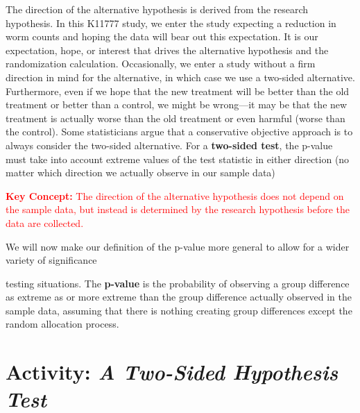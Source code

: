 \documentclass[
]{report}
\begin{document}
The direction of the alternative hypothesis is derived from the research hypothesis. In this K11777 study, we
enter the study expecting a reduction in worm counts and hoping the data will bear out this expectation. It is
our expectation, hope, or interest that drives the alternative hypothesis and the randomization calculation. Occasionally,
we enter a study without a firm direction in mind for the alternative, in which case we use a two-sided
alternative. Furthermore, even if we hope that the new treatment will be better than the old treatment or better
than a control, we might be wrong---it may be that the new treatment is actually worse than the old treatment
or even harmful (worse than the control). Some statisticians argue that a conservative objective approach is to
always consider the two-sided alternative. For a \textbf{two-sided test}, the p-value must take into account extreme
values of the test statistic in either direction (no matter which direction we actually observe in our sample data)

\Large

\textbf{\textcolor{red}{Key Concept:}}
\textcolor{red}{The direction of the alternative hypothesis does not depend on the sample data, but instead is determined
by the research hypothesis before the data are collected.}

\normalsize

We will now make our definition of the p-value more general to allow for a wider variety of significance

testing situations. The \textbf{p-value} is the probability of observing a group difference as extreme as or more extreme
than the group difference actually observed in the sample data, assuming that there is nothing creating group
differences except the random allocation process.

\section*{\texorpdfstring{Activity: \emph{A Two-Sided Hypothesis Test}}{Activity: A Two-Sided Hypothesis Test}}\label{activity-a-two-sided-hypothesis-test}
\end{document}
